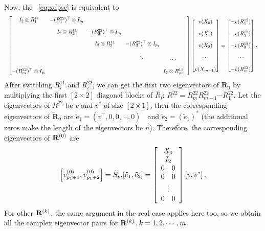 \documentclass[final,leqno,onefignum,onetabnum]{siamltexmm}
\begin{document}
Now, the \pse\ \eqref{eq:xdpse} is equivalent to
\begin{equation}
  \label{eq:xdpsdcomplex}
  \resizebox{\linewidth}{!}{%
  $
  \setlength{\arraycolsep}{3pt}
  \begin{bmatrix}
    I_{2}\otimes R^{11}_{1} & -(R^{22}_{1})^\top \otimes I_{p_{1}} &  & \\[1em]
    & I_{2}\otimes R^{11}_{2} & -(R^{22}_{2})^\top  \otimes I_{p_{1}} &  &\\[1em]
    &  & I_{2}\otimes R^{11}_{3} & -(R^{22}_{3})^\top \otimes I_{p_{1}} &  &\\[1em]
    & & & \ddots &\cdots & \\[1em]
    -(R^{22}_{m})^\top \otimes I_{p_{1}} & & & & I_{2}\otimes R^{11}_{m}
  \end{bmatrix}
  \begin{bmatrix}
    v(X_{0}) \\[1em]
    v(X_{1})  \\[1em]
    v(X_{2})  \\[1em]
    \cdots \\[1em]
    v(X_{m-1})
  \end{bmatrix}
  =
  \begin{bmatrix}
    -v(R^{12}_{1}) \\[1em]
    -v(R^{12}_{2}) \\[1em]
    -v(R^{12}_{3}) \\[1em]
    \cdots \\[1em]
    -v(R^{12}_{m})
  \end{bmatrix} $%
}
\,.
\end{equation}
After switching $R^{11}_{i}$ and $R^{22}_{i}$, we can get the first two
eigenvectors of $\mathbf{\tilde{R}}_{0}$ by multiplying the first
$[2\!\times\! 2]$ diagonal blocks of $\tilde{R_{i}}$:
$R^{22}=R^{22}_{m}R^{22}_{m-1}\cdots R^{22}_{1}$. Let the eigenvectors of
$R^{22}$ be $v$ and $v^{*}$ of size $[2\!\times\! 1]$, then the
corresponding eigenvectors of $\mathbf{\tilde{R}}_{0}$ are
$\tilde{e}_{1}=(v^\top,0,0,\cdots,0)^\top $ and
$\tilde{e}_{2}=(\tilde{e}_{1})^{*}$ (the additional zeros make the length
of the eigenvectors be $n$). Therefore, the corresponding eigenvectors
of $\mathbf{R}^{(0)}$ are
\[
\left[v_{p_{1}+1}^{(0)},v_{p_{1}+2}^{(0)}\right]
 =\hat{S}_{m}[\tilde{e}_{1},\tilde{e}_{2}]
 = \left[
   \begin{array}{c}
   X_{0} \\
   I_{2}    \\
   0 \quad 0\\
   0 \quad 0\\
   \vdots\\
   0 \quad 0
   \end{array}
 \right]
 [v,v^{*}]
\,.
\]
For other $\mathbf{R}^{(k)}$, the same argument in the real case applies
here too, so we obtain all the complex eigenvector pairs for
$\mathbf{R}^{(k)}\,,k=1,2,\cdots,m$.
\end{document}
